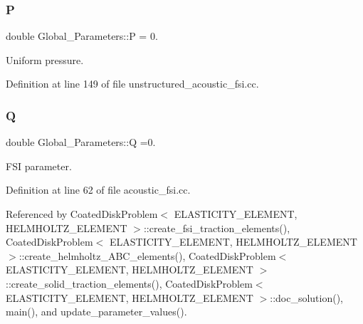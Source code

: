 \mbox{\label{namespaceGlobal__Parameters_a31fb55c20db4aa0127aafa20f0d76731}} 
\subsubsection{\texorpdfstring{P}{P}}
{\footnotesize\ttfamily double Global\+\_\+\+Parameters\+::P = 0.}



Uniform pressure. 



Definition at line 149 of file unstructured\+\_\+acoustic\+\_\+fsi.\+cc.

\mbox{\label{namespaceGlobal__Parameters_a7814fddf663e56168174a42d2cd6b4c1}} 
\subsubsection{\texorpdfstring{Q}{Q}}
{\footnotesize\ttfamily double Global\+\_\+\+Parameters\+::Q =0.}



F\+SI parameter. 



Definition at line 62 of file acoustic\+\_\+fsi.\+cc.



Referenced by Coated\+Disk\+Problem$<$ E\+L\+A\+S\+T\+I\+C\+I\+T\+Y\+\_\+\+E\+L\+E\+M\+E\+N\+T, H\+E\+L\+M\+H\+O\+L\+T\+Z\+\_\+\+E\+L\+E\+M\+E\+N\+T $>$\+::create\+\_\+fsi\+\_\+traction\+\_\+elements(), Coated\+Disk\+Problem$<$ E\+L\+A\+S\+T\+I\+C\+I\+T\+Y\+\_\+\+E\+L\+E\+M\+E\+N\+T, H\+E\+L\+M\+H\+O\+L\+T\+Z\+\_\+\+E\+L\+E\+M\+E\+N\+T $>$\+::create\+\_\+helmholtz\+\_\+\+A\+B\+C\+\_\+elements(), Coated\+Disk\+Problem$<$ E\+L\+A\+S\+T\+I\+C\+I\+T\+Y\+\_\+\+E\+L\+E\+M\+E\+N\+T, H\+E\+L\+M\+H\+O\+L\+T\+Z\+\_\+\+E\+L\+E\+M\+E\+N\+T $>$\+::create\+\_\+solid\+\_\+traction\+\_\+elements(), Coated\+Disk\+Problem$<$ E\+L\+A\+S\+T\+I\+C\+I\+T\+Y\+\_\+\+E\+L\+E\+M\+E\+N\+T, H\+E\+L\+M\+H\+O\+L\+T\+Z\+\_\+\+E\+L\+E\+M\+E\+N\+T $>$\+::doc\+\_\+solution(), main(), and update\+\_\+parameter\+\_\+values().

